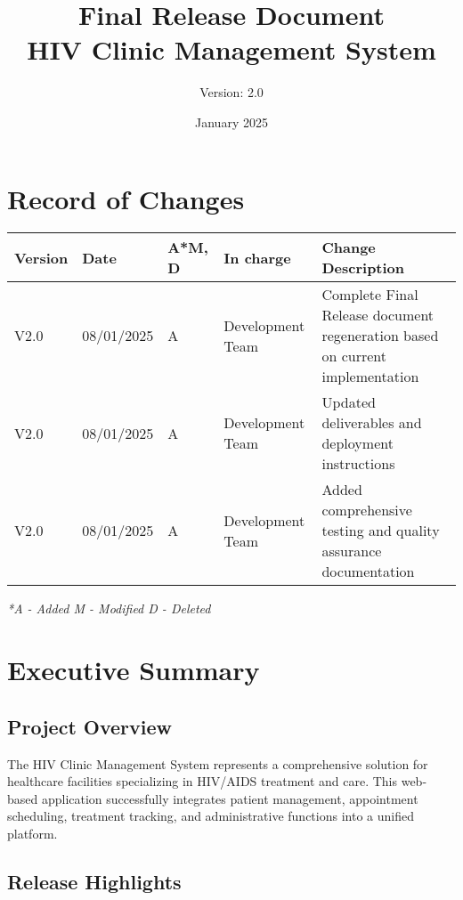 \documentclass[12pt,a4paper]{article}
\title{\textbf{Final Release Document\\HIV Clinic Management System}}
\author{Version: 2.0}
\date{January 2025}
\begin{document}
\maketitle
\thispagestyle{empty}

\newpage

\section*{Record of Changes}

\begin{longtable}{|p{2cm}|p{2cm}|p{1cm}|p{3cm}|p{6cm}|}
\hline
\textbf{Version} & \textbf{Date} & \textbf{A*M, D} & \textbf{In charge} & \textbf{Change Description} \\
\hline
V2.0 & 08/01/2025 & A & Development Team & Complete Final Release document regeneration based on current implementation \\
\hline
V2.0 & 08/01/2025 & A & Development Team & Updated deliverables and deployment instructions \\
\hline
V2.0 & 08/01/2025 & A & Development Team & Added comprehensive testing and quality assurance documentation \\
\hline
\end{longtable}

\textit{*A - Added M - Modified D - Deleted}

\newpage

\tableofcontents

\newpage

\section{Executive Summary}

\subsection{Project Overview}

The HIV Clinic Management System represents a comprehensive solution for healthcare facilities specializing in HIV/AIDS treatment and care. This web-based application successfully integrates patient management, appointment scheduling, treatment tracking, and administrative functions into a unified platform.

\subsection{Release Highlights}
\end{document}
